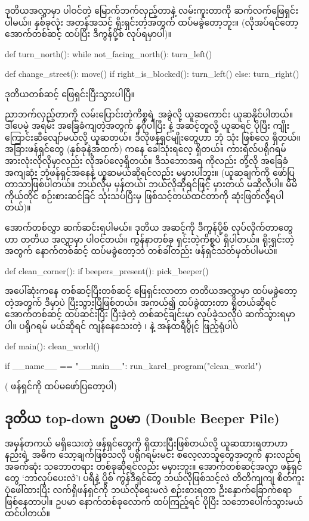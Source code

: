 ဒုတိယအလွှာမှာ ပါဝင်တဲ့ မြောက်ဘက်လှည့်တာနဲ့ လမ်းကူးတာကို ဆက်လက်ဖြေရှင်းပါမယ်။ နှစ်ခုလုံး အတန်အသင့် ရိုးရှင်းတဲ့အတွက် ထပ်မခွဲတော့ဘူး။ (လိုအပ်ရင်တော့ အောက်တစ်ဆင့် ထပ်ပြီး ဒီကွန်ပို့စ် လုပ်ရမှာပါ)။
%
\begin{py}
def turn_north():
    while not_facing_north():
        turn_left()
\end{py}
%
%
\begin{py}
def change_street():
    move()
    if right_is_blocked():
        turn_left()
    else:
        turn_right()
\end{py}
%
ဒုတိယတစ်ဆင့် ဖြေရှင်းပြီးသွားပါပြီ။
\begin{mytcbox}
ညာဘက်လှည့်တာကို လမ်းပြောင်းတဲ့ကိစ္စရဲ့ အခွဲလို့ ယူဆကောင်း ယူဆနိုင်ပါတယ်။ ဒါပေမဲ့ အရမ်း အခြေခံကျတဲ့အတွက် နဂိုပါပြီး  နဲ့ အဆင့်တူလို့ ယူဆရင် ပိုပြီး ကျိုးကြောင်းဆီလျော်မယ်လို့ ယူဆတယ်။ ဒီလိုဖန်ရှင်မျိုးတွေဟာ ဘုံ  သုံး ဖြစ်လေ့ ရှိတယ်။ အခြားဖန်ရှင်တွေ (နှစ်ခုနဲ့အထက်) ကနေ ခေါ်သုံးရလေ့ ရှိတယ်။ ကားရဲလ်ပရိုဂရမ် အားလုံးလိုလိုမှာလည်း လိုအပ်လေ့ရှိတယ်။ ဒီသဘောအရ  ကိုလည်း \fEn{,}  တို့လို အခြေခံ အကျဆုံး ဘုံဖန်ရှင်အနေနဲ့ ယူဆမယ်ဆိုရင်လည်း မမှားပါဘူး။
\betweentcboxpar
(ယူဆချက်ကို ဖော်ပြတာသာဖြစ်ပါတယ်။ ဘယ်လိုမှ မှန်တယ်၊ ဘယ်လိုဆိုရင်ဖြင့် မှားတယ် မဆိုလိုပါ။ မိမိကိုယ်တိုင် စဉ်းစားဆင်ခြင် သုံးသပ်ပြီးမှ ဖြစ်သင့်တယ်ထင်တာကို ဆုံးဖြတ်လို့ရပါတယ်)။ 
\end{mytcbox}
အောက်တစ်လွှာ ဆက်ဆင်းရပါမယ်။ ဒုတိယ အဆင့်ကို ဒီကွန်ပို့စ် လုပ်လိုက်တာတွေဟာ တတိယ အလွှာမှာ ပါဝင်တယ်။  ကွန်နာတစ်ခု ရှင်းတဲ့ကိစ္စပဲ ရှိပါတယ်။ ရိုးရှင်းတဲ့အတွက် နောက်တစ်ဆင့် ထပ်မခွဲတော့ဘဲ တစ်ခါတည်း ဖန်ရှင်သတ်မှတ်ပါမယ်။ 
%
\begin{py}
def clean_corner():
    if beepers_present():
        pick_beeper()
\end{py}
%
အပေါ်ဆုံးကနေ တစ်ဆင့်ပြီးတစ်ဆင့် ဖြေရှင်းလာတာ တတိယအလွှာမှာ ထပ်မခွဲတော့တဲ့အတွက် ဒီမှာပဲ ပြီးသွားပြီဖြစ်တယ်။ အကယ်၍ ထပ်ခွဲထားတာ ရှိတယ်ဆိုရင် အောက်တစ်ဆင့် ထပ်ဆင်းပြီး ပြီးခဲ့တဲ့ တစ်ဆင့်ချင်းမှာ လုပ်ခဲ့သလိုပဲ ဆက်သွားရမှာပါ။ ပရိုဂရမ်  မယ်ဆိုရင် ကျန်နေသေးတဲ့  ၊  နဲ့ အန်ထရီပွိုင့် ဖြည့်ရုံပါပဲ

%
\begin{py}
def main():
    clean_world()

if __name__ == "__main__":
    run_karel_program("clean_world")
\end{py}
%
( ဖန်ရှင်ကို ထပ်မဖော်ပြတော့ပါ)

\subsection*{ဒုတိယ top-down ဥပမာ (Double Beeper Pile)}
အမှန်တကယ် မရှိသေးတဲ့ ဖန်ရှင်တွေကို ရှိထားပြီးဖြစ်တယ်လို့ ယူဆထားရတာဟာ  နည်းရဲ့ အဓိက သော့ချက်ဖြစ်သလို ပရိုဂရမ်းမင်း စလေ့လာသူတွေအတွက် နားလည်ရ အခက်ဆုံး သဘောတရား တစ်ခုဆိုရင်လည်း မမှားဘူး။ အောက်တစ်ဆင့်အလွှာ ဖန်ရှင်တွေ  ‘ဘာလုပ်ပေးလဲ’၊ ပရီနဲ့ ပို့စ် ကွန်ဒီရှင်တွေ ဘယ်လိုဖြစ်သင့်လဲ တိတိကျကျ စိတ်ကူးပုံဖေါ်ထားပြီး လက်ရှိဖန်ရှင်ကို ဘယ်လိုရေးမလဲ စဉ်းစားရတာ ဦးနှောက်\allowbreak ခြောက်စရာ ဖြစ်နေတာပါ။ ဥပမာ နောက်တစ်ခုလောက် ထပ်ကြည့်ရင် ပိုပြီး သဘောပေါက်သွားမယ် ထင်ပါတယ်။ 

